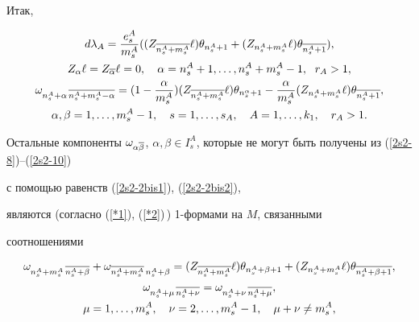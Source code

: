 Итак,


\begin{gather}


\label{2s2-8}


d\lambda_A = \frac{e^A_s}{m^A_s}


((Z_{\ol {n^A_s + m^A_s}}\ell)\theta_{n_s^A +1} +


(Z_{n^A_s +m^A_s} \ell)\theta_{\ol {n^A_s +1}}),\\


%


\label{2s2-9}


Z_{\alpha}\ell = Z_{\ol{\alpha}}\ell = 0, \quad


\alpha=n^A_s+1,\dotsc,n^A_s +m^A_s-1,\; \ r_A > 1,\\


%


\label{2s2-10}


\omega_{n^A_s+\alpha \, \ol{n^A_s+m^A_s-\alpha}} =


(1-\frac{\alpha}{m^A_s}) (Z_{\ol{n^A_s+m^A_s}}\ell)


\theta_{n^{\alpha}_s+1} - \frac{\alpha}{m^A_s} (Z_{n^A_s +m^A_s}\ell)


\theta_{\ol{n^A_s+1}},\\


%


\alpha,\beta=1,\dotsc,m^A_s -1, \quad s=1,\dotsc,s_A, \quad A=1,\dotsc,k_1,


\quad r_A > 1.\notag


\end{gather}


Остальные компоненты $\omega_{\alpha\ol\beta}$, $\alpha,\beta \in


I^A_s$, которые не могут быть получены из (\ref{2s2-8})--(\ref{2s2-10})


с помощью равенств (\ref{2s2-2bis1}), (\ref{2s2-2bis2}),


являются (согласно (\ref{*1}), (\ref{*2})\,) 1-формами на $M$, связанными


соотношениями


\begin{gather}


\label{2s2-11}


\omega_{n^A_s+m^A_s\, \ol{n^A_s+\beta}}+


\omega_{\ol{n^A_s+m^A_s}\, n^A_s+\beta}


= (Z_{\ol{n^A_s+m^A_s}}\ell)


\theta_{n^A_s+\beta+1} +


(Z_{n^A_s+m^A_s}\ell) \theta_{\ol{n^A_s+\beta+1}},\\


%


\label{2s2-11star}


\omega_{n^A_s+\mu\, \ol{n^A_s+\nu}}=


\omega_{n^A_s+\nu\, \ol{n^A_s+\mu}},\\


\mu =1,\dotsc,m^A_s, \quad \nu=2,\dotsc,m^A_s - 1, \quad \mu+\nu


\neq m^A_s,\notag


\end{gather}


